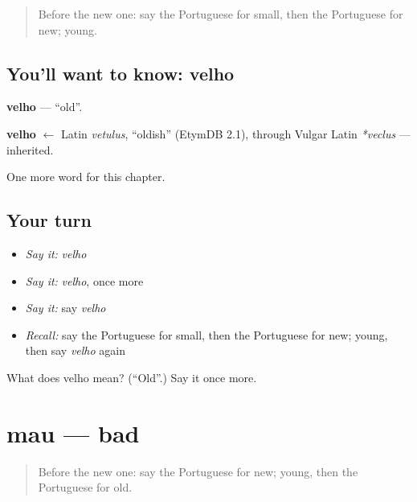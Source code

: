 \label{lesson:PT-C64-velho}



\begin{quote}
Before the new one: say the Portuguese for small, then the Portuguese for new; young.
\end{quote}

\subsection*{You'll want to know: velho}
\textbf{velho} — \textquotedblleft{}old\textquotedblright{}.

\begin{cousinweb}
\textbf{velho} $\leftarrow$ Latin \emph{vetulus}, \textquotedblleft{}oldish\textquotedblright{} (EtymDB 2.1), through Vulgar Latin \emph{*veclus} — inherited.
\end{cousinweb}

\begin{grammarlens}[title={What you've built}]
One more word for this chapter.
\end{grammarlens}

\subsection*{Your turn}
\begin{itemize}
\raggedright
  \item \emph{Say it:} \emph{velho}
  \item \emph{Say it:} \emph{velho}, once more
  \item \emph{Say it:} say \emph{velho}
  \item \emph{Recall:} say the Portuguese for small, then the Portuguese for new; young, then say \emph{velho} again
\end{itemize}

\begin{tcolorbox}[breakable,colback=teal!4,colframe=teal!35!black,title={Before you move on}]
What does velho mean? (\textquotedblleft{}Old\textquotedblright{}.) Say it once more.
\end{tcolorbox}
\section[mau]{mau — bad}

\label{lesson:PT-C64-mau}



\begin{quote}
Before the new one: say the Portuguese for new; young, then the Portuguese for old.
\end{quote}


